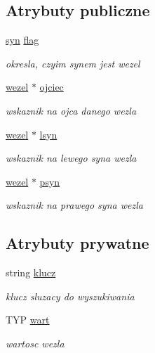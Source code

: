 \subsection*{\-Atrybuty publiczne}
\begin{DoxyCompactItemize}
\item 
\hyperlink{drzewo_8hh_a9bf0b5cfb3ec8e645ac2e89e92db4361}{syn} \hyperlink{classwezel_afdf37f0bdec8aad5a7bdb490ac12f6f1}{flag}
\begin{DoxyCompactList}\small\item\em okresla, czyim synem jest wezel \end{DoxyCompactList}\item 
\hyperlink{classwezel}{wezel} $\ast$ \hyperlink{classwezel_a85d0d08cd058b7ba0546c31e7cb464b0}{ojciec}
\begin{DoxyCompactList}\small\item\em wskaznik na ojca danego wezla \end{DoxyCompactList}\item 
\hyperlink{classwezel}{wezel} $\ast$ \hyperlink{classwezel_aea9a623088a96fc878c52ac35625f961}{lsyn}
\begin{DoxyCompactList}\small\item\em wskaznik na lewego syna wezla \end{DoxyCompactList}\item 
\hyperlink{classwezel}{wezel} $\ast$ \hyperlink{classwezel_ad11efeb4a2370777c00dce1ad6cd6431}{psyn}
\begin{DoxyCompactList}\small\item\em wskaznik na prawego syna wezla \end{DoxyCompactList}\end{DoxyCompactItemize}
\subsection*{\-Atrybuty prywatne}
\begin{DoxyCompactItemize}
\item 
string \hyperlink{classwezel_ada78704962c0e466156d3175b6cf9228}{klucz}
\begin{DoxyCompactList}\small\item\em klucz sluzacy do wyszukiwania \end{DoxyCompactList}\item 
\-T\-Y\-P \hyperlink{classwezel_a40046e679b18d040aaaacd2beccf7fed}{wart}
\begin{DoxyCompactList}\small\item\em wartosc wezla \end{DoxyCompactList}\end{DoxyCompactItemize}


